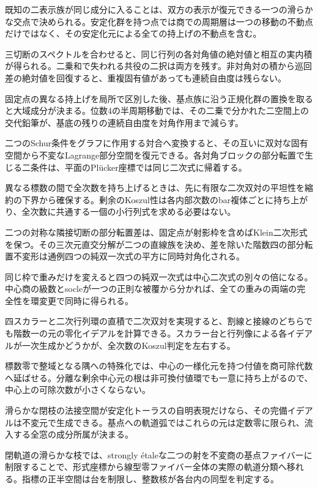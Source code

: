\documentclass[11pt,a4paper]{ltjsarticle}
\begin{document}
既知の二表示族が同じ成分に入ることは、双方の表示が復元できる一つの滑らかな交点で決められる。安定化群を持つ点では商での周期層は一つの移動の不動点だけではなく、その安定化元による全ての持上げの不動点を含む。

三切断のスペクトルを合わせると、同じ行列の各対角値の絶対値と相互の実内積が得られる。二乗和で失われる共役の二択は両方を残す。非対角対の積から巡回差の絶対値を回復すると、重複固有値があっても連続自由度は残らない。

固定点の異なる持上げを局所で区別した後、基点族に沿う正規化群の置換を取ると大域成分が決まる。位数4の半周期移動では、その二乗で分かれた二空間上の交代鉛筆が、基底の残りの連続自由度を対角作用まで減らす。

二つのSchur条件をグラフに作用する対合へ変換すると、その互いに双対な固有空間から不変なLagrange部分空間を復元できる。各対角ブロックの部分転置で生じる二条件は、平面のPlücker座標では同じ二次式に帰着する。

異なる標数の間で全次数を持ち上げるときは、先に有限な二次双対の平坦性を縮約の下界から確保する。剰余のKoszul性は各内部次数のbar複体ごとに持ち上がり、全次数に共通する一個の小行列式を求める必要はない。

二つの対称な隣接切断の部分転置差は、固定点が射影枠を含めばKlein二次形式を保つ。その三次元直交分解が二つの直線族を決め、差を除いた階数四の部分転置不変形は通例四つの純双一次式の平方に同時対角化される。

同じ枠で重みだけを変えると四つの純双一次式は中心二次式の別々の倍になる。中心商の級数とsocleが一つの正則な被覆から分かれば、全ての重みの両端の完全性を環変更で同時に得られる。

四スカラーと二次行列環の直積で二次双対を実現すると、割線と接線のどちらでも階数一の元の零化イデアルを計算できる。スカラー台と行列像による各イデアルが一次生成かどうかが、全次数のKoszul判定を左右する。

標数零で整域となる隅への特殊化では、中心の一様化元を持つ付値を商可除代数へ延ばせる。分離な剰余中心元の根は非可換付値環でも一意に持ち上がるので、中心上の可除次数が小さくならない。

滑らかな閉枝の法接空間が安定化トーラスの自明表現だけなら、その完備イデアルは不変元で生成できる。基点への軌道弧ではこれらの元は定数零に限られ、流入する全窓の成分所属が決まる。

閉軌道の滑らかな枝では、strongly étaleな二つの射を不変商の基点ファイバーに制限することで、形式座標から線型零ファイバー全体の実際の軌道分類へ移れる。指標の正半空間は台を制限し、整数核が各台内の同型を判定する。
\end{document}
